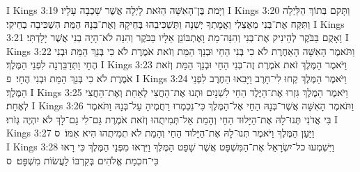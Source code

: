 I Kings 3:19	וַיָּמת בֶּן־הָאִשָּׁה הַזֹּאת לָיְלָה אֲשֶׁר שָׁכְבָה עָלָיו׃
I Kings 3:20	וַתָּקם בְּתוֹךְ הַלַּיְלָה וַתִּקַּח אֶת־בְּנִי מֵאֶצְלִי וַאֲמָתְךָ יְשֵׁנָה וַתַּשְׁכִּיבֵהוּ בְּחֵיקָהּ וְאֶת־בְּנָהּ הַמֵּת הִשְׁכִּיבָה בְחֵיקִי׃
I Kings 3:21	וָאָקֻם בַּבֹּקֶר לְהֵינִיק אֶת־בְּנִי וְהִנֵּה־מֵת וָאֶתְבּוֹנֵן אֵלָיו בַּבֹּקֶר וְהִנֵּה לֹא־הָיָה בְנִי אֲשֶׁר יָלָדְתִּי׃
I Kings 3:22	וַתֹּאמֶר הָאִשָּׁה הָאַחֶרֶת לֹא כִי בְּנִי הַחַי וּבְנֵךְ הַמֵּת וְזֹאת אֹמֶרֶת לֹא כִי בְּנֵךְ הַמֵּת וּבְנִי הֶחָי וַתְּדַבֵּרְנָה לִפְנֵי הַמֶּלֶךְ׃
I Kings 3:23	וַיֹּאמֶר הַמֶּלֶךְ זֹאת אֹמֶרֶת זֶה־בְּנִי הַחַי וּבְנֵךְ הַמֵּת וְזֹאת אֹמֶרֶת לֹא כִי בְּנֵךְ הַמֵּת וּבְנִי הֶחָי׃ {פ}
I Kings 3:24	וַיֹּאמֶר הַמֶּלֶךְ קְחוּ לִי־חָרֶב וַיָּבִאוּ הַחֶרֶב לִפְנֵי הַמֶּלֶךְ׃
I Kings 3:25	וַיֹּאמֶר הַמֶּלֶךְ גִּזְרוּ אֶת־הַיֶּלֶד הַחַי לִשְׁנָיִם וּתְנוּ אֶת־הַחֲצִי לְאַחַת וְאֶת־הַחֲצִי לְאֶחָת׃
I Kings 3:26	וַתֹּאמֶר הָאִשָּׁה אֲשֶׁר־בְּנָהּ הַחַי אֶל־הַמֶּלֶךְ כִּי־נִכְמְרוּ רַחֲמֶיהָ עַל־בְּנָהּ וַתֹּאמֶר  בִּי אֲדֹנִי תְּנוּ־לָהּ אֶת־הַיָּלוּד הַחַי וְהָמֵת אַל־תְּמִיתֻהוּ וְזֹאת אֹמֶרֶת גַּם־לִי גַם־לָךְ לֹא יִהְיֶה גְּזֹרוּ׃
I Kings 3:27	וַיַּעַן הַמֶּלֶךְ וַיֹּאמֶר תְּנוּ־לָהּ אֶת־הַיָּלוּד הַחַי וְהָמֵת לֹא תְמִיתֻהוּ הִיא אִמּוֹ׃ {ס}        
I Kings 3:28	וַיִּשְׁמְעוּ כל־יִשְׂרָאֵל אֶת־הַמִּשְׁפָּט אֲשֶׁר שָׁפַט הַמֶּלֶךְ וַיִּרְאוּ מִפְּנֵי הַמֶּלֶךְ כִּי רָאוּ כִּי־חכְמַת אֱלֹהִים בְּקִרְבּוֹ לַעֲשׂוֹת מִשְׁפָּט׃ {ס}        
